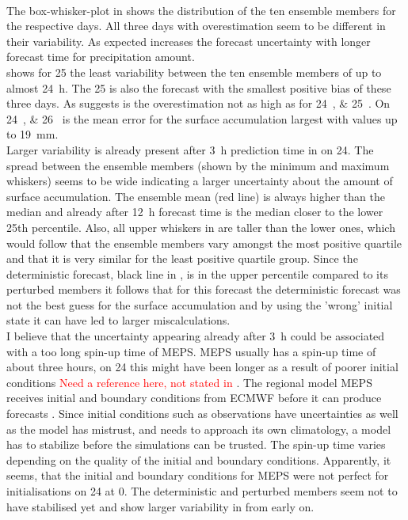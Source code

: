 \\
The box-whisker-plot in  shows the distribution of the ten ensemble members for the respective days. All three days with overestimation seem to be different in their variability. As expected increases the forecast uncertainty with longer forecast time for precipitation amount.  
\\
 shows for \SI{25}{\dec} the least variability between the ten ensemble members of up to almost \SI{24}{\hour}. The \SI{25}{\dec} is also the forecast with the smallest positive bias of these three days. As  suggests is the overestimation not as high as for \SIlist{24;25}{\dec}. On \SIlist{24;26}{\dec} is the mean error for the surface accumulation largest with values up to \SI{19}{\mm}. 
\\
Larger variability is already present after \SI{3}{\hour} prediction time in  on \SI{24}{\dec}. The spread between the ensemble members (shown by the minimum and maximum whiskers) seems to be wide indicating a larger uncertainty about the amount of surface accumulation. The ensemble mean (red line) is always higher than the median and already after \SI{12}{\hour} forecast time is the median closer to the lower 25th percentile. Also, all upper whiskers in  are taller than the lower ones, which would follow that the ensemble members vary amongst the most positive quartile and that it is very similar for the least positive quartile group. Since the deterministic forecast, black line in , is in the upper percentile compared to its perturbed members it follows that for this forecast the deterministic forecast was not the best guess for the surface accumulation and by using the 'wrong' initial state it can have led to larger miscalculations. 
\\
I believe that the uncertainty appearing already after \SI{3}{\hour} could be associated with a too long spin-up time of MEPS. MEPS usually has a spin-up time of about three hours, on \SI{24}{\dec} this might have been longer as a result of poorer initial conditions \textcolor{red}{Need a reference here, not stated in \citet{muller_arome-metcoop:_2017}}. The regional model MEPS receives initial and boundary conditions from ECMWF before it can produce forecasts \citet{muller_arome-metcoop:_2017}. Since initial conditions such as observations have uncertainties as well as the model has mistrust, and needs to approach its own climatology, a model has to stabilize before the simulations can be trusted. The spin-up time varies depending on the quality of the initial and boundary conditions. Apparently, it seems, that the initial and boundary conditions for MEPS were not perfect for initialisations on \SI{24}{\dec} at \SI{0}{\UTC}. The deterministic and perturbed members seem not to have stabilised yet and show larger variability in  from early on.
